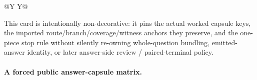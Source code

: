 \documentclass[11pt]{article}
\begin{document}
\begin{table}[t]
\begin{tabularx}{\linewidth}{@{}Y Y@{}}
\bottomrule
\end{tabularx}
\caption{A minimal public answer-capsule card. This is the smallest answer-side public answer later terse papers can quote directly when the live issue is one exact audience/question/piece bundle rather than the whole-question handoff or the final emitted answer object.}
\label{tab:minimal-public-answer-capsule-card}
\end{table}

This card is intentionally non-decorative: it pins the actual worked capsule keys, the imported route/branch/coverage/witness anchors they preserve, and the one-piece stop rule without silently re-owning whole-question bundling, emitted-answer identity, or later answer-side review / paired-terminal policy.\cite{series:workedexample}

\paragraph{A forced public answer-capsule matrix.}
\end{document}
